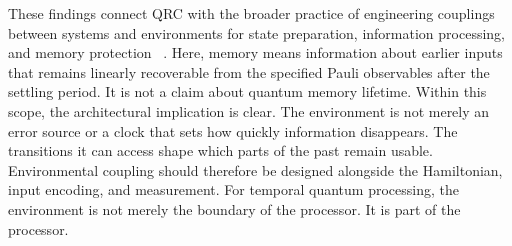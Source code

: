 These findings connect QRC with the broader practice of engineering
couplings between systems and environments for state preparation, information processing,
and memory protection
~\cite{Poyatos1996,Verstraete2009,Pastawski2011,Harrington2022,Cattaneo2019,
Brehm2021,Sheremet2023,CattaneoPRX2023}. Here, memory means information about
earlier inputs that remains linearly recoverable from the specified Pauli
observables after the settling period. It is not a claim about quantum memory
lifetime. Within this scope, the architectural implication is clear. The
environment is not merely an error source or a clock that sets how quickly
information disappears. The transitions it can access shape which parts of the
past remain usable. Environmental coupling should therefore be designed
alongside the Hamiltonian, input encoding, and measurement. For temporal quantum
processing, the environment is not merely the boundary of the processor. It is
part of the processor.
